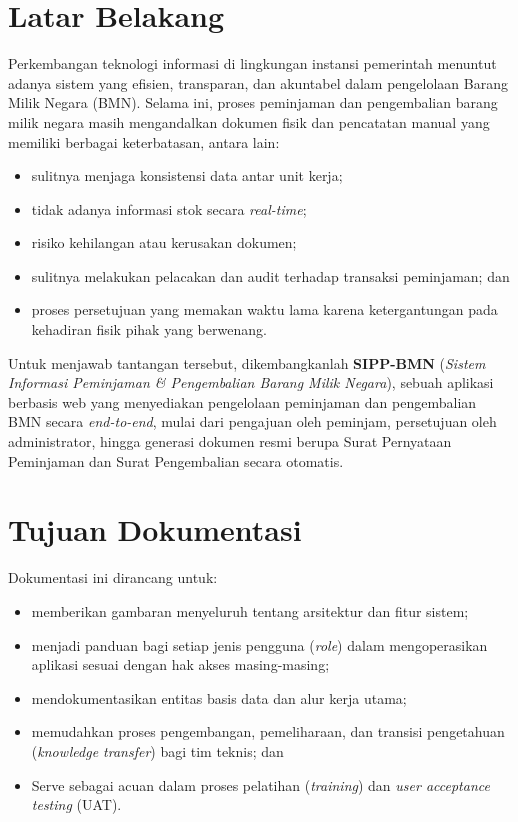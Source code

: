 \documentclass[
  12pt,
  a4paper,
  oneside,
  final
]{report}
\begin{document}
\section{Latar Belakang}
Perkembangan teknologi informasi di lingkungan instansi pemerintah menuntut
adanya sistem yang efisien, transparan, dan akuntabel dalam pengelolaan
Barang Milik Negara (BMN). Selama ini, proses peminjaman dan pengembalian
barang milik negara masih mengandalkan dokumen fisik dan pencatatan manual
yang memiliki berbagai keterbatasan, antara lain:
\begin{itemize}
  \item sulitnya menjaga konsistensi data antar unit kerja;
  \item tidak adanya informasi stok secara {\it real-time};
  \item risiko kehilangan atau kerusakan dokumen;
  \item sulitnya melakukan pelacakan dan audit terhadap transaksi
        peminjaman; dan
  \item proses persetujuan yang memakan waktu lama karena ketergantungan
        pada kehadiran fisik pihak yang berwenang.
\end{itemize}

Untuk menjawab tantangan tersebut, dikembangkanlah {\bfseries SIPP-BMN}
({\it Sistem Informasi Peminjaman \& Pengembalian Barang Milik Negara}),
sebuah aplikasi berbasis web yang menyediakan pengelolaan peminjaman dan
pengembalian BMN secara {\it end-to-end}, mulai dari pengajuan oleh
peminjam, persetujuan oleh administrator, hingga generasi dokumen resmi
berupa Surat Pernyataan Peminjaman dan Surat Pengembalian secara otomatis.

\section{Tujuan Dokumentasi}
Dokumentasi ini dirancang untuk:
\begin{itemize}
  \item memberikan gambaran menyeluruh tentang arsitektur dan fitur sistem;
  \item menjadi panduan bagi setiap jenis pengguna ({\it role}) dalam
        mengoperasikan aplikasi sesuai dengan hak akses masing-masing;
  \item mendokumentasikan entitas basis data dan alur kerja utama;
  \item memudahkan proses pengembangan, pemeliharaan, dan transisi
        pengetahuan ({\it knowledge transfer}) bagi tim teknis; dan
  \item Serve sebagai acuan dalam proses pelatihan ({\it training}) dan
        {\it user acceptance testing} (UAT).
\end{itemize}
\end{document}
